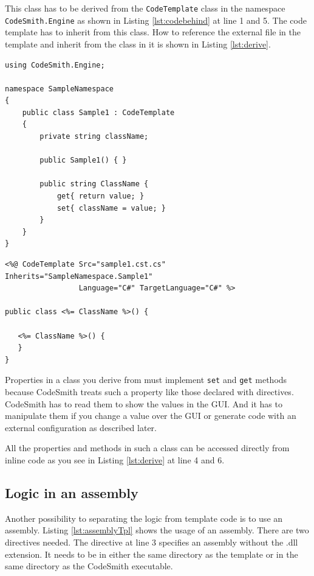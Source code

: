 This class has to be derived from the \verb~CodeTemplate~ class in the namespace 
\verb~CodeSmith.Engine~ as shown in Listing \ref{lst:codebehind} at line 1 and 5. The 
code template has to inherit from this class. How to reference the external 
file in the template and inherit from the class in it is shown in Listing 
\ref{lst:derive}.

\begin{lstlisting}[caption=Code behind (sample1.cst.cs),label=lst:codebehind]
using CodeSmith.Engine;

namespace SampleNamespace
{
	public class Sample1 : CodeTemplate
	{
		private string className;
		
		public Sample1() { }
		
		public string ClassName {
			get{ return value; }
			set{ className = value; }
		}
	}
}
\end{lstlisting}

\begin{lstlisting}[caption=Include a base class (sample1.cst),label=lst:derive]
<%@ CodeTemplate Src="sample1.cst.cs" Inherits="SampleNamespace.Sample1"
                 Language="C#" TargetLanguage="C#" %>
                 
public class <%= ClassName %>() {

   <%= ClassName %>() {
   }
}
\end{lstlisting}

Properties in a class you derive from must implement \verb~set~ and \verb~get~ 
methods because CodeSmith treats such a property like those declared with 
directives. CodeSmith has to read them to show the values in the GUI. And it 
has to manipulate them if you change a value over the GUI or generate code 
with an external configuration as described later.

All the properties and methods in such a class can be accessed directly from 
inline code as you see in Listing \ref{lst:derive} at line 4 and 6.


\subsection{Logic in an assembly}
Another possibility to separating the logic from template code is to use an 
assembly. Listing \ref{lst:assemblyTpl} shows the usage of an assembly. 
There are two directives needed. The directive at line 3 specifies an assembly 
without the .dll extension. It needs to be in either the same directory as the 
template or in the same directory as the CodeSmith executable.

